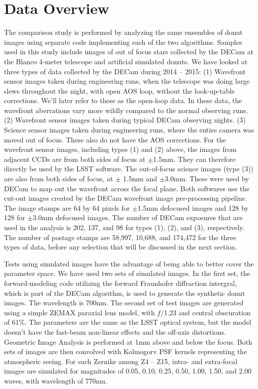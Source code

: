 \documentclass[]{spie}  %
\begin{document}
\section{Data Overview}
\label{sec:data}

The comparison study is performed by analyzing the same ensembles of donut images using 
separate code implementing each of the two algorithms.
Samples used in this study include images of out of focus stars collected by the DECam at the Blanco 4-meter telescope and artificial simulated donuts. 
We have looked at three types of data collected by the DECam during 2014 -- 2015: (1) Wavefront sensor images taken during engineering runs, when the telescope was doing large slews throughout the night, with open AOS loop, without the look-up-table corrections. We'll later refer to these as the open-loop data.
In these data, the wavefront aberrations vary more wildly compared to the normal observing runs.  
(2) Wavefront sensor images taken during typical DECam observing nights. 
(3) Science sensor images taken during engineering runs, where the entire camera was moved out of focus. 
These also do not have the AOS corrections.
For the wavefront sensor images, including types (1) and (2) above, the images from adjacent CCDs are from both sides of focus at $\pm$1.5mm. They can therefore directly be used by the LSST software.
The out-of-focus science images (type (3)) are also from both sides of focus, at $\pm$ 1.5mm and $\pm$3.0mm. These were used by DECam to map out the wavefront across the focal plane.
Both softwares use the cut-out images created by the DECam wavefront image pre-processing pipeline.
The image stamps are 64 by 64 pixels for $\pm$1.5mm defocused images and 128 by 128 for $\pm$3.0mm defocused images.
The number of DECam exposures that are used in the analysis is 202, 137, and 98 for types (1), (2), and (3), respectively. The number of postage stamps are 58,997, 10,688, and 174,472 for the three types of data,
before any selection that will be discussed in the next section.

Tests using simulated images have the advantage of being able to better cover the parameter space.
We have used two sets of simulated images. 
In the first set, the forward-modeling code utilizing the forward Fraunhofer diffraction intergral, which is part of the DECam algorithm, is used to generate the synthetic donut images. The wavelength is 700nm.
The second set of test images are generated using a simple ZEMAX paraxial lens model, with $f$/1.23 and central obscuration of 61\%. The parameters are the same as the LSST optical system, but the model doesn't have the fast-beam non-linear effects and the off-axis distortions. 
Geometric Image Analysis is performed at 1mm above and below the focus.
Both sets of images are then convolved with Kolmogorv PSF kernels representing the atmospheric seeing.
For each Zernike among Z4 -- Z15, intra- and extra-focal images are simulated for magnitudes of 
0.05, 0.10, 0.25, 0.50, 1.00, 1.50, and 2.00 waves, with wavelength of 770nm.
\end{document}
